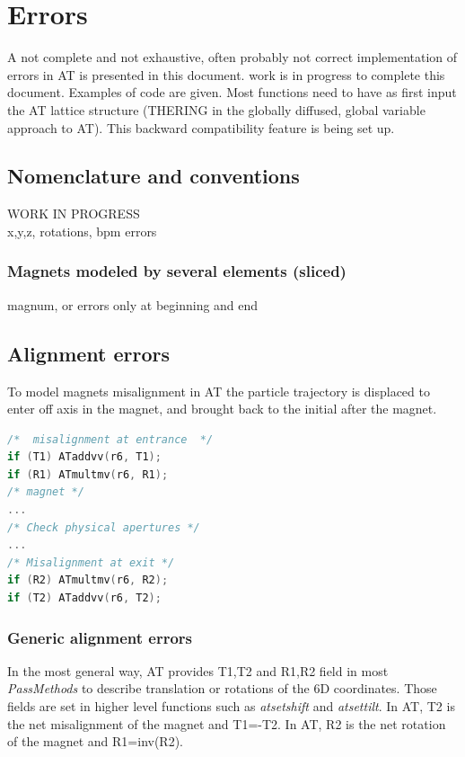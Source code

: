 
\section{Errors}
A not complete and not exhaustive, often probably not correct implementation of errors in AT is presented in this document. work is in progress to complete this document. Examples of code are given.  
Most functions need to have as first input the AT lattice structure (THERING in the globally diffused, global variable approach to AT). This backward compatibility feature is being set up. 
 
\subsection{Nomenclature and conventions}
WORK IN PROGRESS\\
x,y,z, rotations, bpm errors

\subsubsection*{Magnets modeled by several elements (sliced)}
magnum, or errors only at beginning and end

\clearpage
\subsection{Alignment errors}

To model magnets misalignment in AT the particle trajectory is displaced to enter off axis in the magnet, and brought back to the initial after the magnet.

\begin{lstlisting}[language=C]
/*  misalignment at entrance  */
if (T1) ATaddvv(r6, T1);
if (R1) ATmultmv(r6, R1);
/* magnet */
...
/* Check physical apertures */
...
/* Misalignment at exit */
if (R2) ATmultmv(r6, R2);
if (T2) ATaddvv(r6, T2);
\end{lstlisting}		

\subsubsection*{Generic alignment errors}
In the most general way, AT provides T1,T2 and R1,R2 field in most \emph{PassMethods} to describe translation or rotations of the 6D coordinates. Those fields are set in higher level functions such as \emph{atsetshift} and \emph{atsettilt}. 
In AT, T2 is the net misalignment of the magnet and T1=-T2. 
In AT, R2 is the net rotation of the magnet and R1=inv(R2). 

